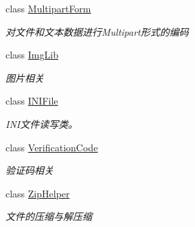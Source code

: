 \begin{DoxyCompactItemize}
class \hyperlink{class_x_c_l_net_tools_1_1_file_handler_1_1_multipart_form}{Multipart\-Form}
\begin{DoxyCompactList}\small\item\em 对文件和文本数据进行\-Multipart形式的编码 \end{DoxyCompactList}\item 
class \hyperlink{class_x_c_l_net_tools_1_1_file_handler_1_1_img_lib}{Img\-Lib}
\begin{DoxyCompactList}\small\item\em 图片相关 \end{DoxyCompactList}\item 
class \hyperlink{class_x_c_l_net_tools_1_1_file_handler_1_1_i_n_i_file}{I\-N\-I\-File}
\begin{DoxyCompactList}\small\item\em I\-N\-I文件读写类。 \end{DoxyCompactList}\item 
class \hyperlink{class_x_c_l_net_tools_1_1_file_handler_1_1_verification_code}{Verification\-Code}
\begin{DoxyCompactList}\small\item\em 验证码相关 \end{DoxyCompactList}\item 
class \hyperlink{class_x_c_l_net_tools_1_1_file_handler_1_1_zip_helper}{Zip\-Helper}
\begin{DoxyCompactList}\small\item\em 文件的压缩与解压缩 \end{DoxyCompactList}\end{DoxyCompactItemize}
